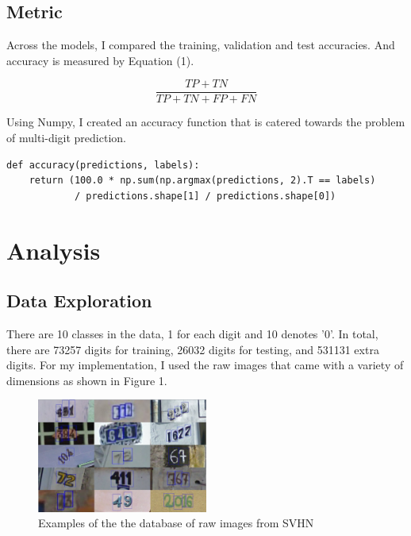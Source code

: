 \documentclass[twoside, column]{article}
\begin{document}

\subsection{Metric}

Across the models, I compared the training, validation and test accuracies. And accuracy is measured by Equation (1).

\begin{equation} \label{}
\frac{TP + TN}{TP + TN + FP + FN}
\end{equation}

Using Numpy, I created an accuracy function that is catered towards the problem of multi-digit prediction. 

\begin{verbatim}
def accuracy(predictions, labels):
    return (100.0 * np.sum(np.argmax(predictions, 2).T == labels)
            / predictions.shape[1] / predictions.shape[0])      
 \end{verbatim}
 

\section{Analysis}

\subsection{Data Exploration}

There are 10 classes in the data, 1 for each digit and 10 denotes '0'. In total, there are 73257 digits for training, 26032 digits for testing, and 531131 extra digits. For my implementation, I used the raw images that came with a variety of dimensions as shown in Figure 1.

\begin{figure}[h]
\caption{Examples of the the database of raw images from SVHN}
\centering
\includegraphics[width=0.5\textwidth]{original_photos}
\end{figure}
\end{document}
